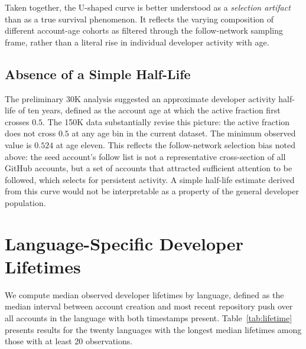 \documentclass[12pt,a4paper]{article}
\begin{document}
Taken together, the U-shaped curve is better understood as a \emph{selection
artifact} than as a true survival phenomenon. It reflects the varying composition
of different account-age cohorts as filtered through the follow-network sampling
frame, rather than a literal rise in individual developer activity with age.

\subsection{Absence of a Simple Half-Life}

The preliminary 30K analysis suggested an approximate developer activity
half-life of ten years, defined as the account age at which the active fraction
first crosses $0.5$. The 150K data substantially revise this picture: the active
fraction does not cross $0.5$ at any age bin in the current dataset. The minimum
observed value is $0.524$ at age eleven. This reflects the follow-network
selection bias noted above: the seed account's follow list is not a
representative cross-section of all GitHub accounts, but a set of accounts
that attracted sufficient attention to be followed, which selects for persistent
activity. A simple half-life estimate derived from this curve would not be
interpretable as a property of the general developer population.

\section{Language-Specific Developer Lifetimes}

We compute median observed developer lifetimes by language, defined as the
median interval between account creation and most recent repository push over all
accounts in the language with both timestamps present.
Table~\ref{tab:lifetime} presents results for the twenty languages with the
longest median lifetimes among those with at least 20 observations.
\end{document}
